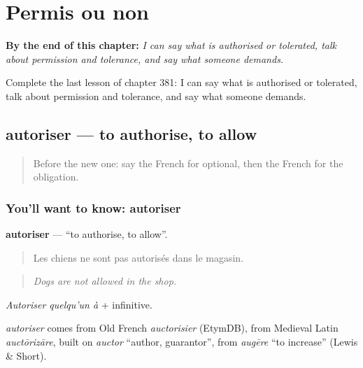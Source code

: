 
\chapter{Permis ou non}
\label{ch:fr-permis-ou-non}

\begin{chapteropening}
\textbf{By the end of this chapter:} \emph{I can say what is authorised or tolerated, talk about permission and tolerance, and say what someone demands.}

Complete the last lesson of chapter 381: I can say what is authorised or tolerated, talk about permission and tolerance, and say what someone demands.
\end{chapteropening}

\section[autoriser]{autoriser — to authorise, to allow}

\label{lesson:FR-C381-autoriser}



\begin{quote}
Before the new one: say the French for optional, then the French for the obligation.
\end{quote}

\subsection*{You'll want to know: autoriser}
\textbf{autoriser} — \textquotedblleft{}to authorise, to allow\textquotedblright{}.

\begin{quote}
Les chiens ne sont pas autorisés dans le magasin.
\end{quote}

\begin{quote}
\emph{Dogs are not allowed in the shop.}
\end{quote}

\emph{Autoriser quelqu'un à} + infinitive.

\begin{cousinweb}
\emph{autoriser} comes from Old French \emph{auctorisier} (EtymDB), from Medieval Latin \emph{auctōrizāre}, built on \emph{auctor} \textquotedblleft{}author, guarantor\textquotedblright{}, from \emph{augēre} \textquotedblleft{}to increase\textquotedblright{} (Lewis \& Short).
\end{cousinweb}

